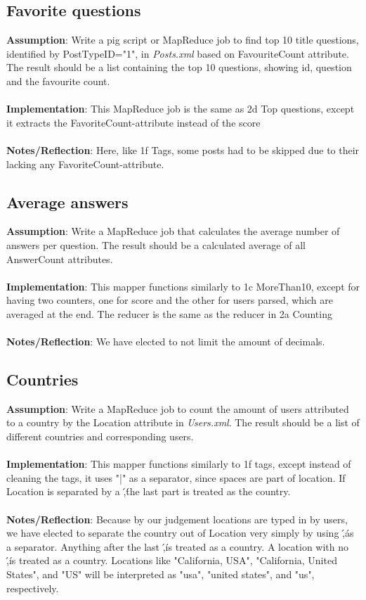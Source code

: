\documentclass[fleqn,10pt]{wlscirep}
\begin{document}
\subsection{Favorite questions}
\textbf{Assumption}: Write a pig script or MapReduce job to find top 10 title questions, identified by PostTypeID="1", in \textit{Posts.xml} based on FavouriteCount attribute. The result should be a list containing the top 10 questions, showing  id, question and the favourite count. \\ \\
\textbf{Implementation}: This MapReduce job is the same as 2d Top questions, except it extracts the FavoriteCount-attribute instead of the score \\ \\
\textbf{Notes/Reflection}: Here, like 1f Tags, some posts had to be skipped due to their lacking any FavoriteCount-attribute.


\subsection{Average answers}
\textbf{Assumption}: Write a MapReduce job that calculates the average number of answers per question. The result should be a calculated average of all AnswerCount attributes. \\ \\
\textbf{Implementation}: This mapper functions similarly to  1c MoreThan10, except for having two counters, one for score and the other for users parsed, which are averaged at the end. The reducer is the same as the reducer in 2a Counting \\ \\
\textbf{Notes/Reflection}: We have elected to not limit the amount of decimals.


\subsection{Countries}
\textbf{Assumption}: Write a MapReduce job to count the amount of users attributed to a country by the Location attribute in \textit{Users.xml}. The result should be a list of different countries and corresponding users. \\ \\
\textbf{Implementation}: This mapper functions similarly to 1f tags, except instead of cleaning the tags, it uses "|" as a separator, since spaces are part of location. If Location is separated by a \',\' the last part is treated as the country. \\ \\
\textbf{Notes/Reflection}: Because by our judgement locations are typed in by users, we have elected to separate the country out of Location very simply by using \',\' as a separator. Anything after the last \',\' is treated as a country. A location with no \',\' is treated as a country. Locations like "California, USA", "California, United States", and "US" will be interpreted as "usa", "united states", and "us", respectively.

\end{document}
